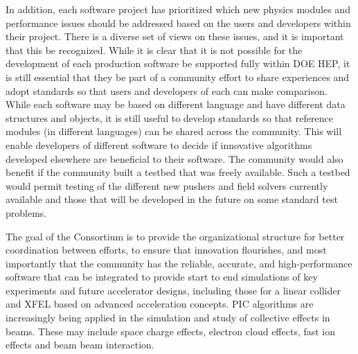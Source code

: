 \documentclass[aps,prstab,reprint,groupedaddress,nofootinbib]{revtex4-1}
\begin{document}
In addition, each software project has prioritized which new physics modules and performance issues should be addressed based on the users and developers within their project. There is a diverse set of views on these issues, and it is important that this be recognized.  While it is clear that it is not possible for the development of each production software be supported fully within DOE HEP, it is still essential that they be part of a community effort to share experiences and adopt standards so that users and developers of each can make comparison. While each software may be based on different language and have different data structures and objects, it is still useful to develop standards so that reference modules (in different languages) can be shared across the community. This will enable developers of different software to decide if innovative algorithms developed elsewhere are beneficial to their software. The community would also benefit if the community built a testbed that was freely available. Such a testbed would permit testing of the different new pushers and field solvers currently available and those that will be developed in the future on some standard test problems.

The goal of the Consortium is to provide the organizational structure for better coordination between efforts, to ensure that innovation flourishes, and most importantly that the community has the reliable, accurate, and high-performance software that can be integrated to provide start to end simulations of key experiments and future accelerator designs, including those  for a linear collider and XFEL based on advanced acceleration concepts. PIC algorithms are increasingly being applied in the simulation and study of collective effects in beams. These may include space charge effects, electron cloud effects, fast ion effects and beam beam interaction. 





\end{document}
